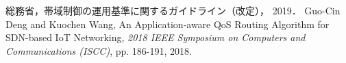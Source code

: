 \documentclass[a4paper,10pt,twocolumn,uplatex]{jsarticle}
\begin{document}
\footnotesize{
  \begin{thebibliography}{99}
     総務省，帯域制御の運用基準に関するガイドライン（改定）， 2019．
     Guo-Cin Deng and Kuochen Wang, An Application-aware QoS Routing Algorithm for SDN-based IoT Networking, \textit{2018 IEEE Symposium on Computers and Communications (ISCC)}, pp. 186-191, 2018.
  \end{thebibliography}
}

% 
% 

\end{document}
